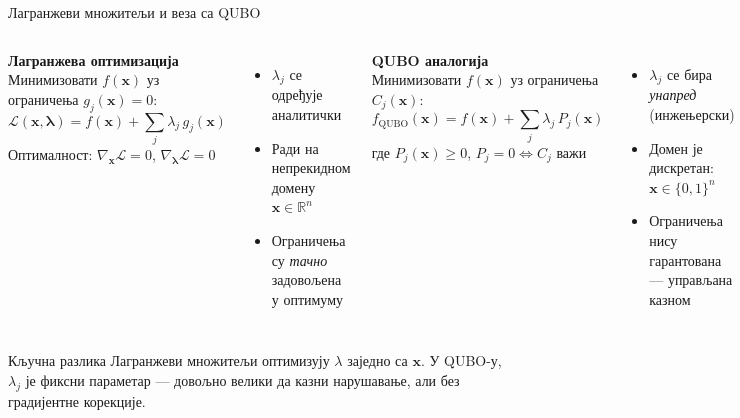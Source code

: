 \documentclass[aspectratio=169]{beamer}
\begin{document}
\begin{frame}{Лагранжеви множитељи и веза са QUBO}
  \begin{columns}[T]
      \textbf{Лагранжева оптимизација}\\[4pt]
      Минимизовати $f(\mathbf{x})$ уз ограничења $g_j(\mathbf{x}) = 0$:
      \[
        \mathcal{L}(\mathbf{x},\boldsymbol{\lambda})
          = f(\mathbf{x}) + \sum_j \lambda_j\, g_j(\mathbf{x})
      \]
      Оптималност: $\nabla_{\mathbf{x}} \mathcal{L} = 0$,\;
      $\nabla_{\boldsymbol{\lambda}} \mathcal{L} = 0$
      \medskip
      \begin{itemize}\small
        \item $\lambda_j$ се одређује аналитички
        \item Ради на непрекидном домену $\mathbf{x}\in\mathbb{R}^n$
        \item Ограничења су \emph{тачно} задовољена у оптимуму
      \end{itemize}
      \textbf{QUBO аналогија}\\[4pt]
      Минимизовати $f(\mathbf{x})$ уз ограничења $C_j(\mathbf{x})$:
      \[
        f_{\mathrm{QUBO}}(\mathbf{x})
          = f(\mathbf{x}) + \sum_j \lambda_j\, P_j(\mathbf{x})
      \]
      где $P_j(\mathbf{x}) \geq 0$,\; $P_j=0 \iff C_j$ важи
      \medskip
      \begin{itemize}\small
        \item $\lambda_j$ се бира \emph{унапред} (инжењерски)
        \item Домен је дискретан: $\mathbf{x}\in\{0,1\}^n$
        \item Ограничења нису гарантована — управљана казном
      \end{itemize}
  \end{columns}

  \bigskip
  \begin{alertblock}{Кључна разлика}
    Лагранжеви множитељи оптимизују $\lambda$ заједно са $\mathbf{x}$.
    У QUBO-у, $\lambda_j$ је фиксни параметар — довољно велики да казни нарушавање,
    али без градијентне корекције.
  \end{alertblock}
\end{frame}
\end{document}
